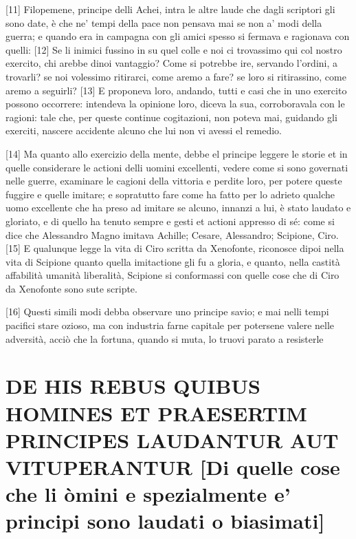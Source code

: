 {[}11{]} Filopemene, principe delli Achei, intra le altre laude che
dagli scriptori gli sono date, è che ne' tempi della pace non pensava
mai se non a' modi della guerra; e quando era in campagna con gli amici
spesso si fermava e ragionava con quelli: {[}12{]} Se li inimici fussino
in su quel colle e noi ci trovassimo qui col nostro exercito, chi arebbe
dinoi vantaggio? Come si potrebbe ire, servando l'ordini, a trovarli? se
noi volessimo ritirarci, come aremo a fare? se loro si ritirassino, come
aremo a seguirli? {[}13{]} E proponeva loro, andando, tutti e casi che
in uno exercito possono occorrere: intendeva la opinione loro, diceva la
sua, corroboravala con le ragioni: tale che, per queste continue
cogitazioni, non poteva mai, guidando gli exerciti, nascere accidente
alcuno che lui non vi avessi el remedio.

{[}14{]} Ma quanto allo exercizio della mente, debbe el principe leggere
le storie et in quelle considerare le actioni delli uomini excellenti,
vedere come si sono governati nelle guerre, examinare le cagioni della
vittoria e perdite loro, per potere queste fuggire e quelle imitare; e
sopratutto fare come ha fatto per lo adrieto qualche uomo excellente che
ha preso ad imitare se alcuno, innanzi a lui, è stato laudato e
gloriato, e di quello ha tenuto sempre e gesti et actioni appresso di
sé: come si dice che Alessandro Magno imitava Achille; Cesare,
Alessandro; Scipione, Ciro. {[}15{]} E qualunque legge la vita di Ciro
scritta da Xenofonte, riconosce dipoi nella vita di Scipione quanto
quella imitactione gli fu a gloria, e quanto, nella castità affabilità
umanità liberalità, Scipione si conformassi con quelle cose che di Ciro
da Xenofonte sono sute scripte.

{[}16{]} Questi simili modi debba observare uno principe savio; e mai
nelli tempi pacifici stare ozioso, ma con industria farne capitale per
potersene valere nelle adversità, acciò che la fortuna, quando si muta,
lo truovi parato a resisterle

\quebra\section{DE HIS REBUS QUIBUS HOMINES ET PRAESERTIM PRINCIPES LAUDANTUR AUT VITUPERANTUR
{[}Di quelle cose che li òmini e spezialmente e' principi sono laudati o biasimati{]}}

